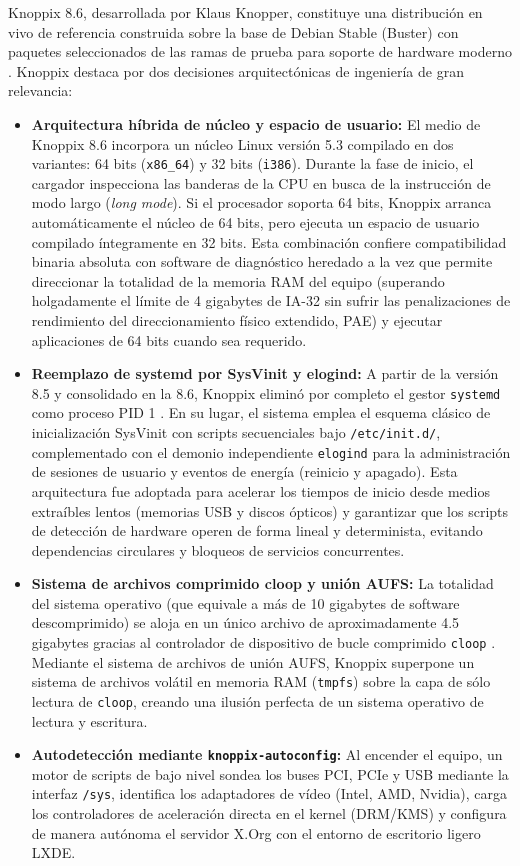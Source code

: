 \documentclass[12pt]{article}
\begin{document}
Knoppix 8.6, desarrollada por Klaus Knopper, constituye una distribución en vivo de referencia construida sobre la base de Debian Stable (Buster) con paquetes seleccionados de las ramas de prueba para soporte de hardware moderno \parencite{knoppix2019release}. Knoppix destaca por dos decisiones arquitectónicas de ingeniería de gran relevancia:
\begin{itemize}[noitemsep, topsep=2pt]
    \item \textbf{Arquitectura híbrida de núcleo y espacio de usuario:} El medio de Knoppix 8.6 incorpora un núcleo Linux versión 5.3 compilado en dos variantes: 64 bits (\texttt{x86\_64}) y 32 bits (\texttt{i386}). Durante la fase de inicio, el cargador inspecciona las banderas de la CPU en busca de la instrucción de modo largo (\textit{long mode}). Si el procesador soporta 64 bits, Knoppix arranca automáticamente el núcleo de 64 bits, pero ejecuta un espacio de usuario compilado íntegramente en 32 bits. Esta combinación confiere compatibilidad binaria absoluta con software de diagnóstico heredado a la vez que permite direccionar la totalidad de la memoria RAM del equipo (superando holgadamente el límite de 4 gigabytes de IA-32 sin sufrir las penalizaciones de rendimiento del direccionamiento físico extendido, PAE) y ejecutar aplicaciones de 64 bits cuando sea requerido.
    \item \textbf{Reemplazo de systemd por SysVinit y elogind:} A partir de la versión 8.5 y consolidado en la 8.6, Knoppix eliminó por completo el gestor \texttt{systemd} como proceso PID 1 \parencite{knoppix2019release}. En su lugar, el sistema emplea el esquema clásico de inicialización SysVinit con scripts secuenciales bajo \texttt{/etc/init.d/}, complementado con el demonio independiente \texttt{elogind} para la administración de sesiones de usuario y eventos de energía (reinicio y apagado). Esta arquitectura fue adoptada para acelerar los tiempos de inicio desde medios extraíbles lentos (memorias USB y discos ópticos) y garantizar que los scripts de detección de hardware operen de forma lineal y determinista, evitando dependencias circulares y bloqueos de servicios concurrentes.
    \item \textbf{Sistema de archivos comprimido cloop y unión AUFS:} La totalidad del sistema operativo (que equivale a más de 10 gigabytes de software descomprimido) se aloja en un único archivo de aproximadamente 4.5 gigabytes gracias al controlador de dispositivo de bucle comprimido \texttt{cloop} \parencite{knopper2024cloop}. Mediante el sistema de archivos de unión AUFS, Knoppix superpone un sistema de archivos volátil en memoria RAM (\texttt{tmpfs}) sobre la capa de sólo lectura de \texttt{cloop}, creando una ilusión perfecta de un sistema operativo de lectura y escritura.
    \item \textbf{Autodetección mediante \texttt{knoppix-autoconfig}:} Al encender el equipo, un motor de scripts de bajo nivel sondea los buses PCI, PCIe y USB mediante la interfaz \texttt{/sys}, identifica los adaptadores de vídeo (Intel, AMD, Nvidia), carga los controladores de aceleración directa en el kernel (DRM/KMS) y configura de manera autónoma el servidor X.Org con el entorno de escritorio ligero LXDE.
\end{itemize}
\end{document}
